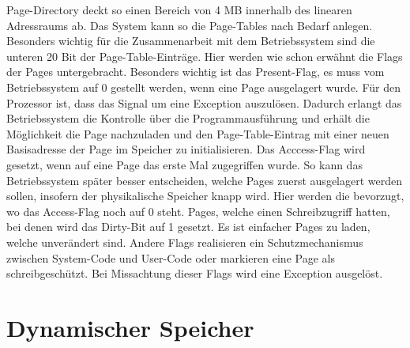 \documentclass[12pt]{book}
\begin{document}
Page-Directory deckt so einen Bereich von 4 MB innerhalb des linearen
Adressraums ab. Das System kann so die Page-Tables nach Bedarf anlegen.
Besonders wichtig für die Zusammenarbeit mit dem Betriebssystem sind die unteren
20 Bit der Page-Table-Einträge. Hier werden wie schon erwähnt die Flags der
Pages untergebracht. Besonders wichtig ist das Present-Flag, es muss vom
Betriebssystem auf 0 gestellt werden, wenn eine Page ausgelagert wurde. Für den
Prozessor ist, dass das Signal um eine Exception auszulösen. Dadurch erlangt das
Betriebssystem die Kontrolle über die Programmausführung und erhält die
Möglichkeit die Page nachzuladen und den Page-Table-Eintrag mit einer neuen
Basisadresse der Page im Speicher zu initialisieren. Das Acccess-Flag wird
gesetzt, wenn auf eine Page das erste Mal zugegriffen wurde. So kann das
Betriebssystem später besser entscheiden, welche Pages zuerst ausgelagert werden
sollen, insofern der physikalische Speicher knapp wird. Hier werden die
bevorzugt, wo das Access-Flag noch auf 0 steht. Pages, welche einen
Schreibzugriff hatten, bei denen wird das Dirty-Bit auf 1 gesetzt. Es ist
einfacher Pages zu laden, welche unverändert sind. Andere Flags realisieren ein
Schutzmechanismus zwischen System-Code und User-Code oder markieren eine Page
als schreibgeschützt. Bei Missachtung dieser Flags wird eine Exception
ausgelöst.

\section{Dynamischer Speicher}
\end{document}
